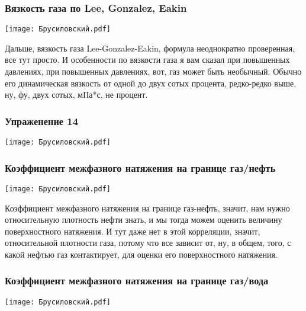 \documentclass[main.tex]{subfiles}
\begin{document}
\subsubsection{Вязкость газа по Lee, Gonzalez, Eakin}

\begin{center}
\texttt{[image: Брусиловский.pdf]}
\end{center}

Дальше, вязкость газа Lee-Gonzalez-Eakin, формула неоднократно проверенная, все тут просто.
И особенности по вязкости газа я вам сказал при повышенных давлениях, при повышенных давлениях, вот, газ может быть необычный.
Обычно его динамическая вязкость от одной до двух сотых процента, редко-редко выше, ну, фу, двух сотых, мПа*с, не процент.

\subsubsection{Упраженение 14}

\begin{center}
\texttt{[image: Брусиловский.pdf]}
\end{center}



\subsubsection{Коэффициент межфазного натяжения на границе газ/нефть}

\begin{center}
\texttt{[image: Брусиловский.pdf]}
\end{center}

Коэффициент межфазного натяжения на границе газ-нефть, значит, нам нужно относительную плотность нефти знать, и мы тогда можем оценить величину поверхностного натяжения.
И тут даже нет в этой корреляции, значит, относительной плотности газа, потому что все зависит от, ну, в общем, того, с какой нефтью газ контактирует, для оценки его поверхностного натяжения.

\subsubsection{Коэффициент межфазного натяжения на границе газ/вода}

\begin{center}
\texttt{[image: Брусиловский.pdf]}
\end{center}
\end{document}

